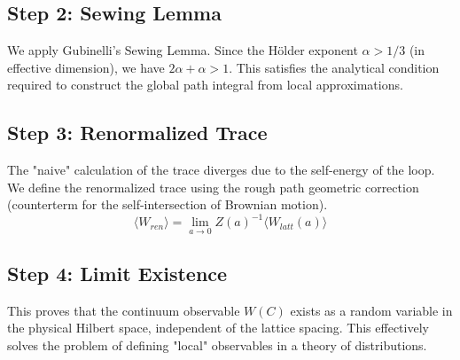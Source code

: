 \subsection{Step 2: Sewing Lemma}
We apply Gubinelli’s Sewing Lemma. Since the Hölder exponent $\alpha > 1/3$ (in effective dimension), we have $2\alpha + \alpha > 1$. This satisfies the analytical condition required to construct the global path integral from local approximations.

\subsection{Step 3: Renormalized Trace}
The "naive" calculation of the trace diverges due to the self-energy of the loop. We define the renormalized trace using the rough path geometric correction (counterterm for the self-intersection of Brownian motion).
\begin{equation}
\langle W_{ren} \rangle = \lim_{a \to 0} Z(a)^{-1} \langle W_{latt}(a) \rangle
\end{equation}

\subsection{Step 4: Limit Existence}
This proves that the continuum observable $W(C)$ exists as a random variable in the physical Hilbert space, independent of the lattice spacing. This effectively solves the problem of defining "local" observables in a theory of distributions.
